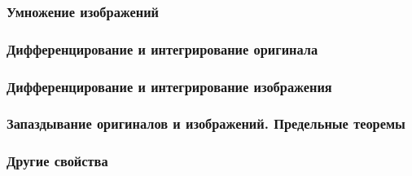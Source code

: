 \documentclass[12pt, a6paper]{extarticle}
\begin{document}
\subsubsection{Умножение изображений}


\subsubsection{Дифференцирование и интегрирование оригинала}


\subsubsection{Дифференцирование и интегрирование изображения}


\subsubsection{Запаздывание оригиналов и изображений. Предельные теоремы}


\subsubsection{Другие свойства}

\newpage
\end{document}
